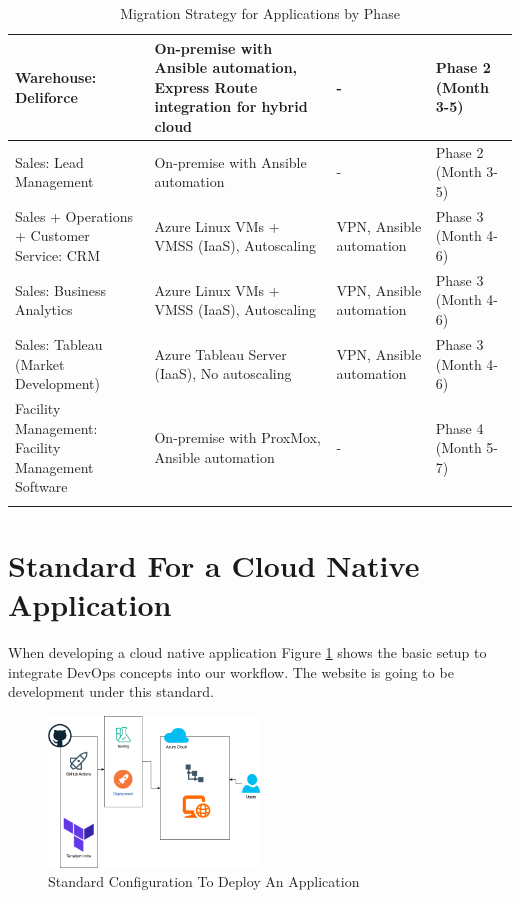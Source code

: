 \documentclass{llncs}
\begin{document}
\begin{longtable}{|p{3.1cm}|p{5.2cm}|p{3.1cm}|l|}
    \hline
    Warehouse: Deliforce & On-premise with Ansible automation, Express Route integration for hybrid cloud & - & Phase 2 (Month 3-5) \\
    \hline
    Sales: Lead Management & On-premise with Ansible automation & - & Phase 2 (Month 3-5) \\
    \hline
    Sales + Operations + Customer Service: CRM & Azure Linux VMs + VMSS (IaaS), Autoscaling & VPN, Ansible automation & Phase 3 (Month 4-6) \\
    \hline
    Sales: Business Analytics & Azure Linux VMs + VMSS (IaaS), Autoscaling & VPN, Ansible automation & Phase 3 (Month 4-6) \\
    \hline
    Sales: Tableau (Market Development) & Azure Tableau Server (IaaS), No autoscaling & VPN, Ansible automation & Phase 3 (Month 4-6) \\
    \hline
    Facility Management: Facility Management Software & On-premise with ProxMox, Ansible automation & - & Phase 4 (Month 5-7) \\
    \hline
    \caption{Migration Strategy for Applications by Phase}
    \end{longtable}
    


\newpage


\section{Standard For a Cloud Native Application}

When developing a cloud native application Figure \ref{CloudStandard} shows the basic setup to integrate DevOps concepts into our workflow.
The website is going to be development under this standard.\\

\begin{figure}[htbp]
    \begin{center}
        \includegraphics[width=0.5\textwidth]{diagrams/AppStandard.drawio.png}
        \vspace{0.01\textwidth}
        \caption{Standard Configuration To Deploy An Application}
        \label{CloudStandard} %
    \end{center}
\end{figure}
\end{document}

